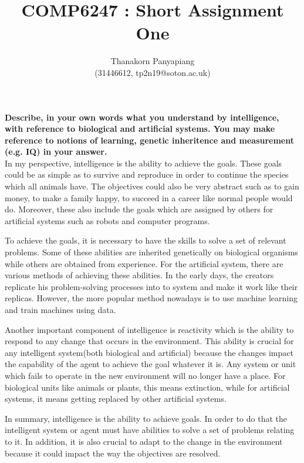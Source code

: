 \documentclass{article}
\title{COMP6247 : Short Assignment One}
\author{Thanakorn Panyapiang\\
(31446612, tp2n19@soton.ac.uk)}
\date{}
\begin{document}
\maketitle

\textbf{Describe, in your own words what you understand by intelligence, with reference to biological
and artificial systems. You may make reference to notions of learning, genetic inheritence and
measurement (e.g. IQ) in your answer.}\\

In my perspective, intelligence is the ability to achieve the goals. These goals could be as simple as to survive and reproduce in order to continue the species which all animals have. The objectives could also be very abstract such as to gain money, to make a family happy, to succeed in a career like normal people would do. Moreover, these also include the goals which are assigned by others for artificial systems such as robots and computer programs.

To achieve the goals, it is necessary to have the skills to solve a set of relevant problems. Some of these abilities are inherited genetically on biological organisms while others are obtained from experience. For the artificial system, there are various methods of achieving these abilities. In the early days, the creators replicate his problem-solving processes into to system and make it work like their replicas. However, the more popular method nowadays is to use machine learning and train machines using data.

Another important component of intelligence is reactivity which is the ability to respond to any change that occurs in the environment. This ability is crucial for any intelligent system(both biological and artificial) because the changes impact the capability of the agent to achieve the goal whatever it is. Any system or unit which fails to operate in the new environment will no longer have a place. For biological units like animals or plants, this means extinction, while for artificial systems, it means getting replaced by other artificial systems.

In summary, intelligence is the ability to achieve goals. In order to do that the intelligent system or agent must have abilities to solve a set of problems relating to it. In addition, it is also crucial to adapt to the change in the environment because it could impact the way the objectives are resolved.
\end{document}

